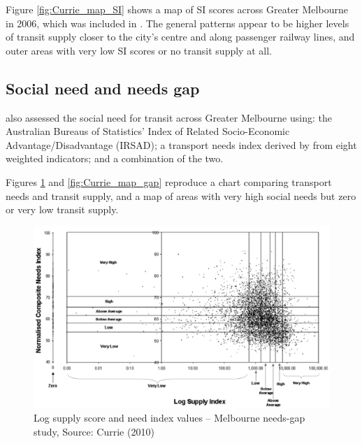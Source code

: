 \documentclass[preprint, 3p,
authoryear]{elsarticle} %
\begin{document}
Figure \ref{fig:Currie_map_SI} shows a map of SI scores across Greater
Melbourne in 2006, which was included in \citet{currie2010identifying}.
The general patterns appear to be higher levels of transit supply closer
to the city's centre and along passenger railway lines, and outer areas
with very low SI scores or no transit supply at all.

\hypertarget{social-need-and-needs-gap}{%
\subsection{Social need and needs gap}\label{social-need-and-needs-gap}}

\citet{currie2010identifying} also assessed the social need for transit
across Greater Melbourne using: the Australian Bureaus of Statistics'
Index of Related Socio-Economic Advantage/Disadvantage (IRSAD); a
transport needs index derived by \citet{currie2010identifying} from
eight weighted indicators; and a combination of the two.

Figures \ref{fig:Currie_chart_gap} and \ref{fig:Currie_map_gap}
reproduce a chart comparing transport needs and transit supply, and a
map of areas with very high social needs but zero or very low transit
supply.

\begin{figure}
\includegraphics[width=1\linewidth]{graphics/Currie2010chart} \caption{Log supply score and need index values – Melbourne needs-gap study, Source: Currie (2010)}\label{fig:Currie_chart_gap}
\end{figure}
\end{document}
